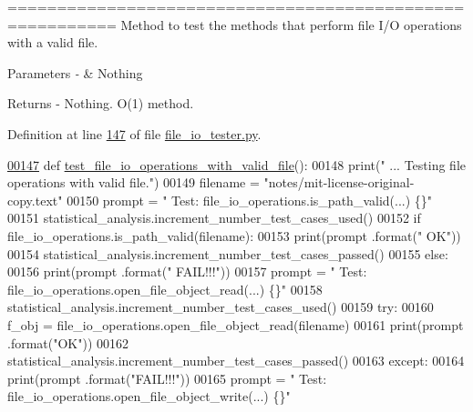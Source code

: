 ========================================================= Method to test the methods that perform file I/\+O operations with a valid file. 


\begin{DoxyParams}{Parameters}
{\em -\/} & Nothing \\
\hline
\end{DoxyParams}
\begin{DoxyReturn}{Returns}
-\/ Nothing. O(1) method. 
\end{DoxyReturn}


Definition at line \hyperlink{file__io__tester_8py_source_l00147}{147} of file \hyperlink{file__io__tester_8py_source}{file\+\_\+io\+\_\+tester.\+py}.


\begin{DoxyCode}
\hypertarget{classutilities_1_1file__io__tester_1_1file__io__operations__tester_l00147}{}\hyperlink{classutilities_1_1file__io__tester_1_1file__io__operations__tester_a9683b5a406697686900d28455bd3d5c3}{00147}     \textcolor{keyword}{def }\hyperlink{classutilities_1_1file__io__tester_1_1file__io__operations__tester_a9683b5a406697686900d28455bd3d5c3}{test\_file\_io\_operations\_with\_valid\_file}():
00148         print(\textcolor{stringliteral}{" ... Testing file operations with valid file."})
00149         filename = \textcolor{stringliteral}{"notes/mit-license-original-copy.text"}
00150         prompt = \textcolor{stringliteral}{"  Test: file\_io\_operations.is\_path\_valid(...) \{\}"}
00151         statistical\_analysis.increment\_number\_test\_cases\_used()
00152         \textcolor{keywordflow}{if} file\_io\_operations.is\_path\_valid(filename):
00153             print(prompt .format(\textcolor{stringliteral}{"  OK"}))
00154             statistical\_analysis.increment\_number\_test\_cases\_passed()
00155         \textcolor{keywordflow}{else}:
00156             print(prompt .format(\textcolor{stringliteral}{"  FAIL!!!"}))
00157         prompt = \textcolor{stringliteral}{"  Test: file\_io\_operations.open\_file\_object\_read(...) \{\}"}
00158         statistical\_analysis.increment\_number\_test\_cases\_used()
00159         \textcolor{keywordflow}{try}:
00160             f\_obj = file\_io\_operations.open\_file\_object\_read(filename)
00161             print(prompt .format(\textcolor{stringliteral}{"OK"}))
00162             statistical\_analysis.increment\_number\_test\_cases\_passed()
00163         \textcolor{keywordflow}{except}:
00164             print(prompt .format(\textcolor{stringliteral}{"FAIL!!!"}))
00165         prompt = \textcolor{stringliteral}{"  Test: file\_io\_operations.open\_file\_object\_write(...)    \{\}"}

\end{DoxyCode}
